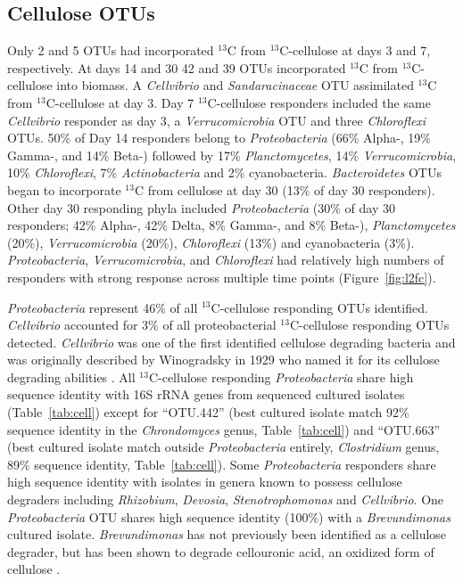 \subsection{Cellulose OTUs}
Only 2 and 5 OTUs had incorporated $^{13}$C from
$^{13}$C-cellulose at days 3 and 7, respectively. At days 14 and 30
42 and 39 OTUs incorporated $^{13}$C from $^{13}$C-cellulose into
biomass. A \textit{Cellvibrio} and \textit{Sandaracinaceae} OTU assimilated
$^{13}$C from $^{13}$C-cellulose at day 3. Day 7 $^{13}$C-cellulose responders
included the same \textit{Cellvibrio} responder as day 3,
a \textit{Verrucomicrobia} OTU and three \textit{Chloroflexi} OTUs.  50\% of
Day 14 responders belong to \textit{Proteobacteria} (66\% Alpha-, 19\% Gamma-,
and 14\% Beta-) followed by 17\% \textit{Planctomycetes}, 14\%
\textit{Verrucomicrobia}, 10\% \textit{Chloroflexi}, 7\%
\textit{Actinobacteria} and 2\% cyanobacteria. \textit{Bacteroidetes} OTUs
began to incorporate $^{13}$C from cellulose at day
30 (13\% of day 30 responders). Other day 30 responding phyla included
\textit{Proteobacteria} (30\% of day 30 responders; 42\% Alpha-, 42\% Delta,
8\% Gamma-, and 8\% Beta-), \textit{Planctomycetes} (20\%),
\textit{Verrucomicrobia} (20\%), \textit{Chloroflexi} (13\%) and
cyanobacteria (3\%). \textit{Proteobacteria}, \textit{Verrucomicrobia}, and
\textit{Chloroflexi} had relatively high numbers of responders with strong
response across multiple time points (Figure~\ref{fig:l2fc}).

\textit{Proteobacteria} represent 46\% of all $^{13}$C-cellulose responding
OTUs identified. \textit{Cellvibrio} accounted for 3\% of all proteobacterial
$^{13}$C-cellulose responding OTUs detected. \textit{Cellvibrio} was one of the
first identified cellulose degrading bacteria and was originally described by
Winogradsky in 1929 who named it for its cellulose degrading abilities
\citep{boone2001bergeys}. All $^{13}$C-cellulose responding
\textit{Proteobacteria} share high sequence identity with 16S rRNA genes from
sequenced cultured isolates (Table~\ref{tab:cell}) except for ``OTU.442'' (best
cultured isolate match 92\% sequence identity in the \textit{Chrondomyces}
genus, Table~\ref{tab:cell}) and ``OTU.663'' (best cultured isolate match
outside \textit{Proteobacteria} entirely, \textit{Clostridium} genus, 89\%
sequence identity, Table~\ref{tab:cell}). Some \textit{Proteobacteria}
responders share high sequence identity with isolates in genera known to
possess cellulose degraders including \textit{Rhizobium}, \textit{Devosia},
\textit{Stenotrophomonas} and \textit{Cellvibrio}. One \textit{Proteobacteria}
OTU shares high sequence identity (100\%) with a \textit{Brevundimonas} cultured
isolate.  \textit{Brevundimonas} has not previously been identified as a
cellulose degrader, but has been shown to degrade cellouronic acid, an oxidized
form of cellulose \citep{Tavernier_2008}.

